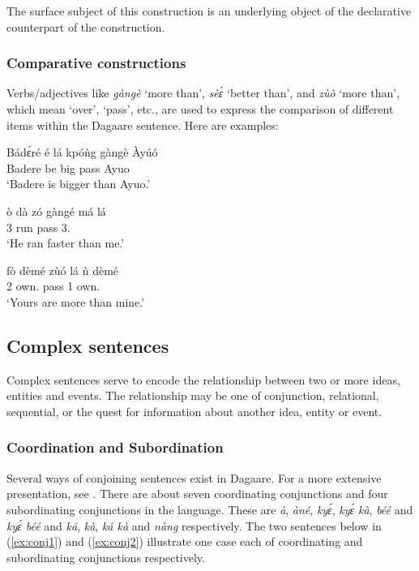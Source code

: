 The surface subject of this construction is an underlying object of the declarative counterpart
of the construction.
\fi 
\subsubsection{Comparative constructions}
Verbs/adjectives like \textit{gàngè} ‘more than’, \textit{sèɛ̀} ‘better than’, and \textit{zùò} ‘more than’, which
mean `over', `pass', etc., are used to express the comparison of different items within the
Dagaare sentence. Here are examples:

\ea \gll Bádɛ́ré é lá kpóǹg gàngè Àyúó\\
Badere be {\FOC} big pass Ayuo\\
\glt ‘Badere is bigger than Ayuo.’\z

\ea \gll  ò dà zó gàngé má lá\\
3{\SG} {\PST} run pass 3{\SG}.{\OBJ} {\FOC}\\
\glt ‘He ran faster than me.’\z

\ea \gll  fò dèmé zùó lá ǹ dèmé\\
2{\SG} own.{\PL} pass {\FOC} 1{\SG} own.{\PL}\\
\glt ‘Yours are more than mine.’\z



\subsection{ Complex sentences}
Complex sentences serve to encode the relationship between two or more ideas,
entities and events. The relationship may be one of conjunction, relational, sequential, or the
quest for information about another idea, entity or event.

\subsubsection{ Coordination and Subordination}
Several ways of conjoining sentences exist in Dagaare. For a more extensive
presentation, see \citet{Bodomo1997}. There are about seven coordinating conjunctions and four
subordinating conjunctions in the language. These are \textit{à}, \textit{àné}, \textit{kyɛ́}, \textit{kyɛ́ kà}, \textit{béé} and \textit{kyɛ́ béé} and \textit{ká}, \textit{kà}, \textit{ká kà} and \textit{nàng} respectively. The two sentences below in (\ref{ex:conj1}) and (\ref{ex:conj2})
illustrate one case each of coordinating and subordinating conjunctions respectively.

